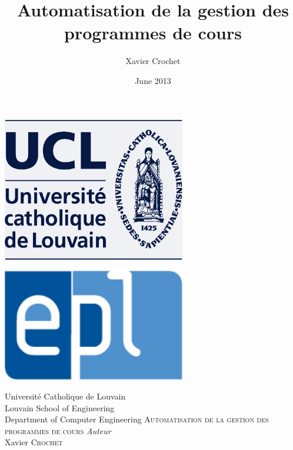 \documentclass[11pt,a4paper,twoside]{book}
\begin{document}
\renewcommand{\labelitemi}{$\bullet$}
\frontmatter
\fancyhead{}
\pagestyle{fancy}
\graphicspath{{Pictures/}}

\author{Xavier Crochet}
\title{Automatisation de la gestion des programmes de cours}
\date{June 2013}
\frontmatter
\begin{titlepage}
\begin{center}
\begin{minipage}{0.4\textwidth}
\begin{flushleft} \large
\includegraphics[width=0.6\textwidth]{ucl}
\end{flushleft}
\end{minipage}
\begin{minipage}{0.4\textwidth}
\begin{flushright}
\includegraphics[width=0.6\textwidth]{epl}
\end{flushright}
\end{minipage}
\vfill
Université Catholique de Louvain \\
Louvain School of Engineering \\
Department of Computer Engineering
\vfill
\textsc{\LARGE Automatisation de la gestion des programmes de cours}%
\vfill
\emph{Auteur}\\
\large{Xavier \textsc{Crochet}}
\vfill
\begin{minipage}{0.4\textwidth}

\end{minipage}
\end{center}
\end{titlepage}
\end{document}
